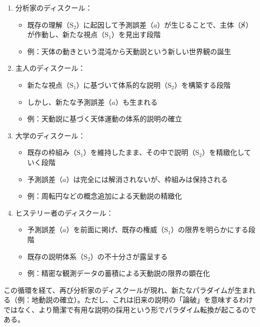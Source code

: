 \begin{enumerate}
\def\labelenumi{\arabic{enumi}.}
\tightlist
\item
  分析家のディスクール：

  \begin{itemize}
  \tightlist
  \item
    既存の理解（\(\textrm{S}_2\)）に起因して予測誤差（\(a\)）が生じることで、主体（\(\cancel{\textrm{S}}\)）が作動し、新たな視点（\(\textrm{S}_1\)）を見出す段階
  \item
    例：天体の動きという混沌から天動説という新しい世界観の誕生
  \end{itemize}
\item
  主人のディスクール：

  \begin{itemize}
  \tightlist
  \item
    新たな視点（\(\textrm{S}_1\)）に基づいて体系的な説明（\(\textrm{S}_2\)）を構築する段階
  \item
    しかし、新たな予測誤差（\(a\)）も生まれる
  \item
    例：天動説に基づく天体運動の体系的説明の確立
  \end{itemize}
\item
  大学のディスクール：

  \begin{itemize}
  \tightlist
  \item
    既存の枠組み（\(\textrm{S}_1\)）を維持したまま、その中で説明（\(\textrm{S}_2\)）を精緻化していく段階
  \item
    予測誤差（\(a\)）は完全には解消されないが、枠組みは保持される
  \item
    例：周転円などの概念追加による天動説の精緻化
  \end{itemize}
\item
  ヒステリー者のディスクール：

  \begin{itemize}
  \tightlist
  \item
    予測誤差（\(a\)）を前面に掲げ、既存の権威（\(\textrm{S}_1\)）の限界を明らかにする段階
  \item
    既存の説明体系（\(\textrm{S}_2\)）の不十分さが露呈する
  \item
    例：精密な観測データの蓄積による天動説の限界の顕在化
  \end{itemize}
\end{enumerate}

この循環を経て、再び分析家のディスクールが現れ、新たなパラダイムが生まれる（例：地動説の確立）。ただし、これは旧来の説明の「論破」を意味するわけではなく、より簡潔で有用な説明の採用という形でパラダイム転換が起こるのである。
